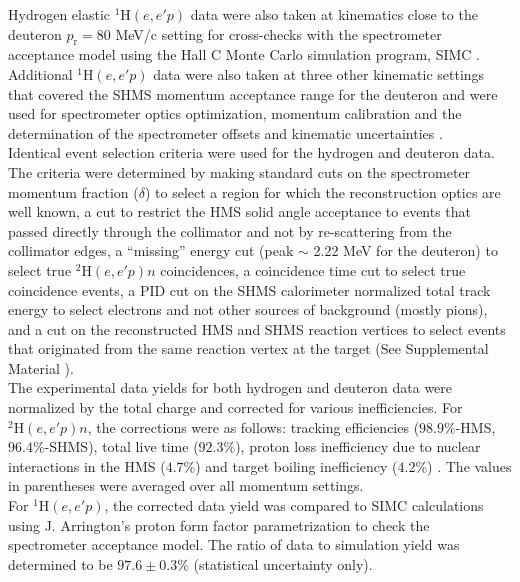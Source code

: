 \indent Hydrogen elastic $^{1}\mathrm{H}(e,e'p)$ data were also taken at kinematics close to the deuteron $p_{\mathrm{r}}=80$ MeV/c setting for cross-checks with the spectrometer acceptance model using the  Hall C Monte Carlo
simulation program, SIMC \cite{PhysRevC.64.054610}. Additional $^{1}\mathrm{H}(e,e'p)$ data were also taken at three other kinematic settings that covered the SHMS momentum acceptance range for the deuteron and were used for spectrometer optics optimization, 
momentum calibration and the determination of the spectrometer offsets and kinematic uncertainties \cite{cyero_phdthesis}.\\
\indent Identical event selection criteria were used for the hydrogen and deuteron data. The criteria were determined by making standard cuts on the spectrometer momentum fraction ($\delta$) to select a region for which the reconstruction optics
are well known,  a cut to restrict the HMS solid angle acceptance to events that passed directly through the collimator and not by re-scattering from the collimator edges, a ``missing''
energy cut (peak $\sim$ 2.22 MeV for the deuteron) to select true $^{2}\mathrm{H}(e,e'p)n$ coincidences, a coincidence time cut to select true coincidence events, a PID cut on the
SHMS calorimeter normalized total track energy to select electrons and not other sources of background (mostly pions), and a cut on the reconstructed HMS and SHMS reaction vertices to select events that 
originated from the same reaction vertex at the target (See Supplemental Material \cite{Suppl_Mat}).\\
\indent The experimental data yields for both hydrogen and deuteron data were normalized by the total charge and corrected for various inefficiencies. For $^{2}\mathrm{H}(e,e'p)n$, the corrections
were as follows: tracking efficiencies ($98.9 \%$-HMS, $96.4 \%$-SHMS), total live time ($92.3 \%$), proton loss inefficiency due to nuclear interactions in the HMS ($4.7 \%$) \cite{cyero_phdthesis} and
target boiling inefficiency ($4.2 \%$) \cite{cyero_phdthesis}. The values in parentheses were averaged over all momentum settings. \\
\indent For $^{1}\mathrm{H}(e,e'p)$, the corrected data yield was compared to SIMC calculations using J. Arrington's proton form factor parametrization \cite{PhysRevC.69.022201} to check the spectrometer acceptance
model. The ratio of data to simulation yield was determined to be $97.6\pm0.3 \%$ (statistical uncertainty only).\\
